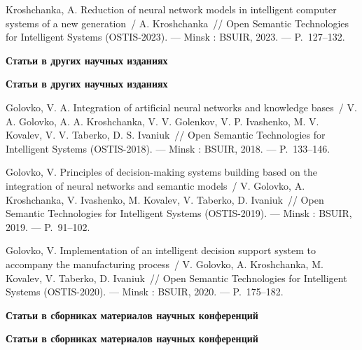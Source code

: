 Kroshchanka, A. Reduction of neural network models in intelligent computer systems of a new generation~/ A. Kroshchanka~// 
 Open Semantic Technologies for Intelligent Systems (OSTIS-2023). ---
\newblock Minsk : BSUIR, 2023. ---
\newblock P.~127--132.

\ifx\isabstract\undefined 
\begin{center}
\vspace{3mm}
{\bf Статьи в других научных изданиях}
\vspace{3mm}
\end{center}
\else
\vspace{2mm}
{\bf Статьи в других научных изданиях}
\vspace{2mm}
\fi

Golovko, V. A. Integration of artiﬁcial neural networks and knowledge bases~/ V. A. Golovko, A. A. Kroshchanka, V. V. Golenkov, V. P. Ivashenko, M. V. Kovalev, V. V. Taberko, D. S. Ivaniuk~// 
 Open Semantic Technologies for Intelligent Systems (OSTIS-2018). ---
\newblock Minsk : BSUIR, 2018. ---
\newblock P.~133--146.

Golovko, V. Principles of decision-making systems building based on the integration of neural networks and semantic models~/ V. Golovko, A. Kroshchanka, V. Ivashenko, M. Kovalev, V. Taberko, D. Ivaniuk~//
 Open Semantic Technologies for Intelligent Systems (OSTIS-2019). ---
\newblock Minsk : BSUIR, 2019. ---
\newblock P.~91--102.

Golovko, V. Implementation of an intelligent decision support system to accompany the manufacturing process~/ V. Golovko, A. Kroshchanka, M. Kovalev, V. Taberko, D. Ivaniuk~// 
 Open Semantic Technologies for Intelligent Systems (OSTIS-2020). ---
\newblock Minsk : BSUIR, 2020. ---
\newblock P.~175--182.

\ifx\isabstract\undefined 
\begin{center}
\vspace{3mm}
{\bf Статьи в сборниках материалов научных конференций}
\vspace{3mm}
\end{center}
\else
\vspace{2mm}
{\bf Статьи в сборниках материалов научных конференций}
\vspace{2mm}
\fi

